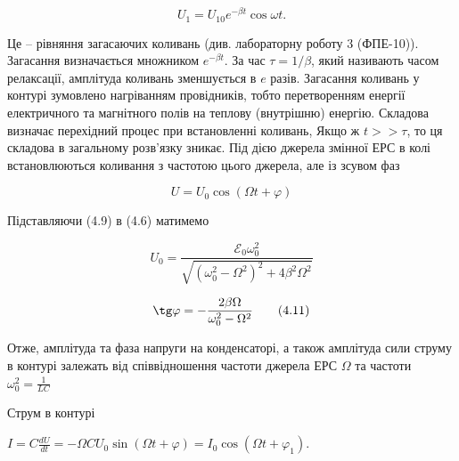 \documentclass[12pt,a4paper]{article}
\begin{document}
    \begin{equation}
        U_1 = U_{10} e^{-\beta t} \cos \omega t.
        \tag{4.8}
    \end{equation}

    \vspace{0.5em}

    Це – рівняння загасаючих коливань
    (див. лабораторну роботу 3 (ФПЕ-10)).
    Загасання визначається множником $e^{-\beta t}$.
    За час $\tau = 1/\beta$, який називають часом релаксації,
    амплітуда коливань зменшується в $e$ разів.
    Загасання коливань у контурі зумовлено нагріванням провідників,
    тобто перетворенням енергії електричного та магнітного полів
    на теплову (внутрішню) енергію.
    Складова визначає перехідний процес при встановленні коливань,
    Якщо ж $t >> \tau$, то ця складова в загальному розв’язку зникає.
    Під дією джерела змінної ЕРС в колі встановлюються коливання
    з частотою цього джерела, але із зсувом фаз

    \vspace{0.5em}

    \begin{equation}
        U = U_0 \cos (\Omega t + \varphi)
        \tag{4.9}
    \end{equation}

    \vspace{0.5em}

    Підставляючи (4.9) в (4.6) матимемо

    \begin{equation}
        U_0 = \frac{\mathcal{E}_0 \omega_0^2}{\sqrt{\left(\omega_0^2 - \Omega^2 \right)^2 + 4\beta^2\Omega^2}}
        \tag{4.10}
    \end{equation}

    \begin{equation}
        \tg \varphi = -\frac{2\beta \Omega}{\omega_0^2 - \Omega^2}
        \tag{4.11}
    \end{equation}

    \vspace{0.5em}

    Отже, амплітуда та фаза напруги на конденсаторі,
    а також амплітуда сили струму в контурі залежать
    від співвідношення частоти джерела ЕРС $\Omega$ та частоти
    $\displaystyle \omega_0^2 = \frac{1}{LC}$

    Струм в контурі

    \vspace{0.5em}

    \begin{center}
        $\displaystyle I = C\frac{dU}{dt} = -\Omega C U_0 \sin(\Omega t + \varphi) = I_0 \cos(\Omega t + \varphi_1)$.
    \end{center}
\end{document}

